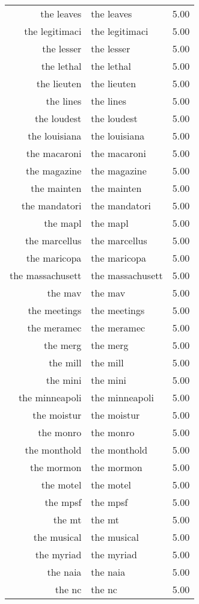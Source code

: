 \begin{table}[ht]
\begin{tabular}{rlr}
  the leaves & the leaves & 5.00 \\ 
  the legitimaci & the legitimaci & 5.00 \\ 
  the lesser & the lesser & 5.00 \\ 
  the lethal & the lethal & 5.00 \\ 
  the lieuten & the lieuten & 5.00 \\ 
  the lines & the lines & 5.00 \\ 
  the loudest & the loudest & 5.00 \\ 
  the louisiana & the louisiana & 5.00 \\ 
  the macaroni & the macaroni & 5.00 \\ 
  the magazine & the magazine & 5.00 \\ 
  the mainten & the mainten & 5.00 \\ 
  the mandatori & the mandatori & 5.00 \\ 
  the mapl & the mapl & 5.00 \\ 
  the marcellus & the marcellus & 5.00 \\ 
  the maricopa & the maricopa & 5.00 \\ 
  the massachusett & the massachusett & 5.00 \\ 
  the mav & the mav & 5.00 \\ 
  the meetings & the meetings & 5.00 \\ 
  the meramec & the meramec & 5.00 \\ 
  the merg & the merg & 5.00 \\ 
  the mill & the mill & 5.00 \\ 
  the mini & the mini & 5.00 \\ 
  the minneapoli & the minneapoli & 5.00 \\ 
  the moistur & the moistur & 5.00 \\ 
  the monro & the monro & 5.00 \\ 
  the monthold & the monthold & 5.00 \\ 
  the mormon & the mormon & 5.00 \\ 
  the motel & the motel & 5.00 \\ 
  the mpsf & the mpsf & 5.00 \\ 
  the mt & the mt & 5.00 \\ 
  the musical & the musical & 5.00 \\ 
  the myriad & the myriad & 5.00 \\ 
  the naia & the naia & 5.00 \\ 
  the nc & the nc & 5.00 \\ 

\end{tabular}
\end{table}
